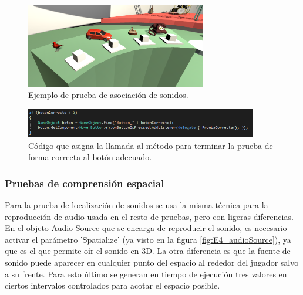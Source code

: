 \begin{figure}
  \centering
    \includegraphics[width=0.7\textwidth]{04.Desarrollo/04.Entrega4/02.Iteracion4_2/00.Figuras/08.sonidos.png}
    \caption{Ejemplo de prueba de asociación de sonidos.}
    \label{fig:E4_sonidos}
\end{figure}

\begin{figure}
  \centering
    \includegraphics[width=0.9\textwidth]{04.Desarrollo/04.Entrega4/02.Iteracion4_2/00.Figuras/09.boton_correcto.png}
    \caption{Código que asigna la llamada al método para terminar la prueba de forma correcta al botón adecuado.}
    \label{fig:E4_botonCorrecto}
\end{figure}




\subsubsection{Pruebas de comprensión espacial}

Para la prueba de localización de sonidos se usa la misma técnica para la reproducción de audio usada en el resto de pruebas, pero con ligeras diferencias. En el objeto Audio Source que se encarga de reproducir el sonido, es necesario activar el parámetro 'Spatialize' (ya visto en la figura \ref{fig:E4_audioSource}), ya que es el que permite oír el sonido en 3D. La otra diferencia es que la fuente de sonido puede aparecer en cualquier punto del espacio al rededor del jugador salvo a su frente. Para esto último se generan en tiempo de ejecución tres valores en ciertos intervalos controlados para acotar el espacio posible.


